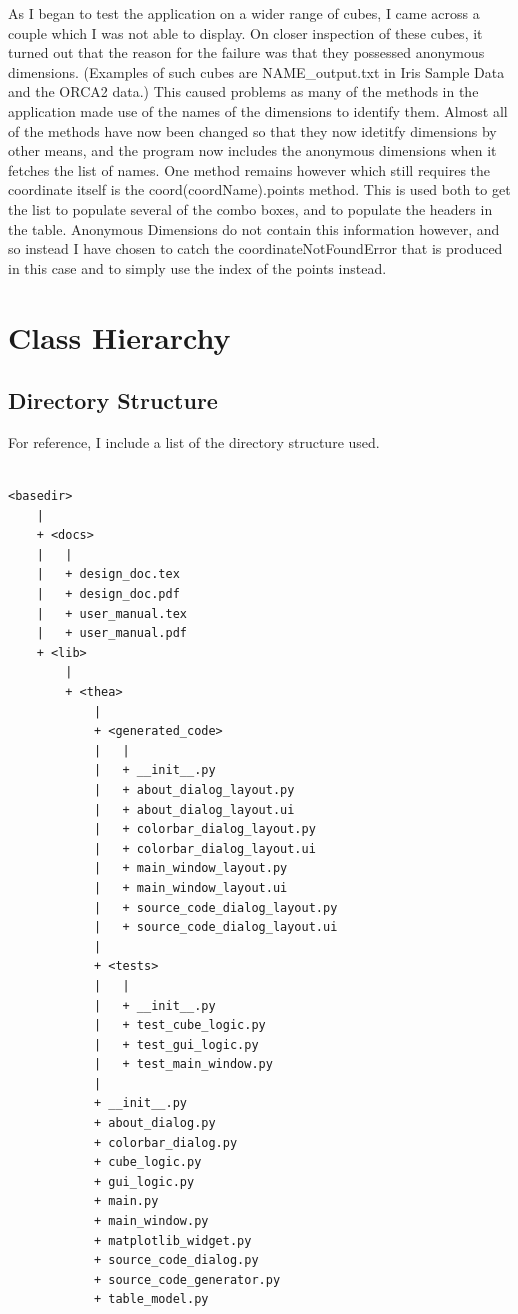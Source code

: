 \documentclass[whitecover]{MO_report}
\begin{document}
As I began to test the application on a wider range of cubes, I came across a
couple which I was not able to display. On closer inspection of these cubes,
it turned out that the reason for the failure was that they possessed anonymous
dimensions. (Examples of such cubes are NAME\_output.txt in Iris Sample Data
and the ORCA2 data.) This caused problems as many of the methods in the application
made use of the names of the dimensions to identify them. Almost all of the
methods have now been changed so that they now idetitfy dimensions by other
means, and the program now includes the anonymous dimensions when it fetches
the list of names. One method remains however which still requires the
coordinate itself is the coord(coordName).points method. This is used both to
get the list to populate several of the combo boxes, and to populate the
headers in the table. Anonymous Dimensions do not contain this information
however, and so instead I have chosen to catch the coordinateNotFoundError
that is produced in this case and to simply use the index of the points instead.


\pagebreak


\chapter{Class Hierarchy}

\section{Directory Structure}

For reference, I include a list of the directory structure used.

\begin{verbatim}

<basedir>
    |
    + <docs>
    |   |
    |   + design_doc.tex
    |   + design_doc.pdf
    |   + user_manual.tex
    |   + user_manual.pdf
    + <lib>
        |
        + <thea>
            |
            + <generated_code>
            |   |
            |   + __init__.py
            |   + about_dialog_layout.py
            |   + about_dialog_layout.ui
            |   + colorbar_dialog_layout.py
            |   + colorbar_dialog_layout.ui
            |   + main_window_layout.py
            |   + main_window_layout.ui
            |   + source_code_dialog_layout.py
            |   + source_code_dialog_layout.ui
            |
            + <tests>
            |   |
            |   + __init__.py
            |   + test_cube_logic.py
            |   + test_gui_logic.py
            |   + test_main_window.py
            |
            + __init__.py
            + about_dialog.py
            + colorbar_dialog.py
            + cube_logic.py
            + gui_logic.py
            + main.py
            + main_window.py
            + matplotlib_widget.py
            + source_code_dialog.py
            + source_code_generator.py
            + table_model.py

\end{verbatim}
\end{document}
